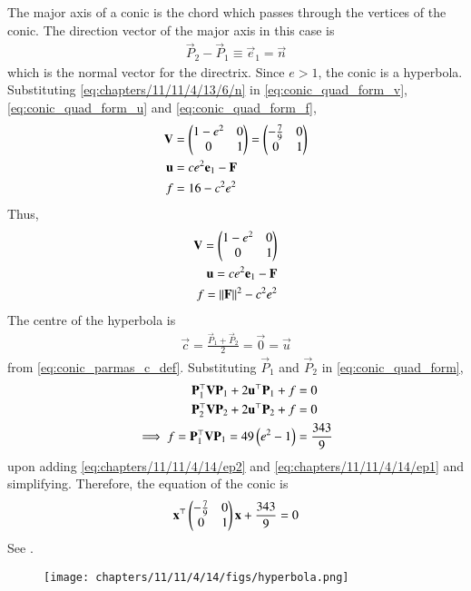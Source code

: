     The major axis of a conic is the chord which passes through the vertices of the conic.
    The direction vector of the major axis in this case is
    \begin{align}
        \vec{P}_2-\vec{P}_1 \equiv \vec{e}_1 = \vec{n}
\label{eq:chapters/11/11/4/13/6/n} 
    \end{align}
    which is the normal vector for the directrix.
    Since $e > 1$, the conic is a hyperbola.
Substituting  
\eqref{eq:chapters/11/11/4/13/6/n} 
in
  \eqref{eq:conic_quad_form_v},
\eqref{eq:conic_quad_form_u}
and
\eqref{eq:conic_quad_form_f},
\begin{align}
	\mathbf{V} &= \begin{pmatrix}1-e^2&0\\0&1\end{pmatrix} = \begin{pmatrix}-\frac{7}{9}&0\\0&1\end{pmatrix} \label{eq:chapters/11/11/4/14/6} 
	\\
	\mathbf{u} &= ce^2\mathbf{e}_1-\mathbf{F}
\label{eq:chapters/11/11/4/14/6/u} 
	\\
	f&=16-c^2e^2
\label{eq:chapters/11/11/4/14/6/f} 
\end{align}
    Thus,
    \begin{align}
        \mathbf{V} = \begin{pmatrix}1-e^2&0\\0&1\end{pmatrix} \label{eq:chapters/11/11/4/14/V-val} \\
	    \mathbf{u} = ce^2\mathbf{e}_1 - \mathbf{F} \label{eq:chapters/11/11/4/14/u-val} \\
        f = \left\lVert\mathbf{F}\right\rVert^2 - c^2e^2 \label{eq:chapters/11/11/4/14/f-val}
    \end{align}
    The centre of the hyperbola is 
\begin{align}
	\vec{c} = \frac{\vec{P}_1+\vec{P}_2}{2} = \vec{0} = \vec{u}
\end{align}
from \eqref{eq:conic_parmas_c_def}.      Substituting $\vec{P}_1$ and $\vec{P}_2$ in 
    \eqref{eq:conic_quad_form},
    \begin{align}
        \mathbf{P}_1^\top\mathbf{VP}_1 + 2\mathbf{u}^\top\mathbf{P}_1 + f &= 0 \label{eq:chapters/11/11/4/14/ep1} \\
        \mathbf{P}_2^\top\mathbf{VP}_2 + 2\mathbf{u}^\top\mathbf{P}_2 + f &= 0 \label{eq:chapters/11/11/4/14/ep2}
	\\
	    \implies f = \mathbf{P}_1^\top\mathbf{VP}_1  = 49\left(e^2-1\right)&=\frac{343}{9}
    \end{align}
    upon adding 
    \eqref{eq:chapters/11/11/4/14/ep2} and \eqref{eq:chapters/11/11/4/14/ep1}
    and simplifying.
    Therefore, the equation of the conic is
    \begin{align}
        \mathbf{x}^\top\begin{pmatrix}-\frac{7}{9}&0\\0&1\end{pmatrix}\mathbf{x} + \frac{343}{9} = 0
    \end{align}
See .
    \begin{figure}[H]
        \centering
        \texttt{[image: chapters/11/11/4/14/figs/hyperbola.png]}
        \caption{}
        \label{fig:chapters/11/11/4/14/hyperbola}
    \end{figure}
